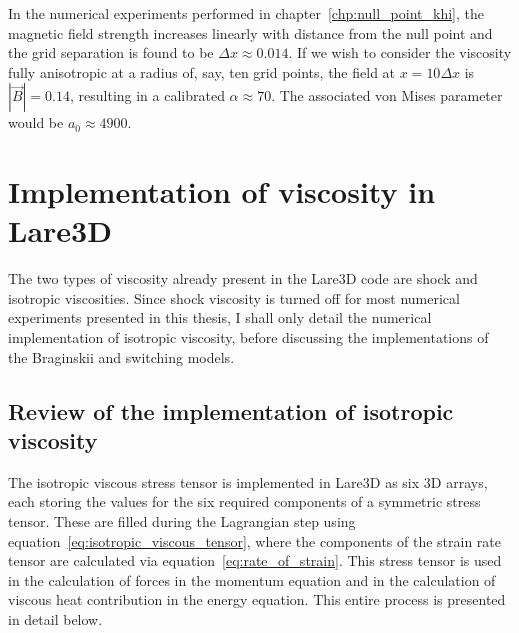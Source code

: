In the numerical experiments performed in chapter~\ref{chp:null_point_khi}, the magnetic field strength increases linearly with distance from the null point and the grid separation is found to be $\Delta x \approx 0.014$. If we wish to consider the viscosity fully anisotropic at a radius of, say, ten grid points, the field at $x = 10 \Delta x$ is $|\vec{B}| = 0.14$, resulting in a calibrated $\alpha \approx 70$. The associated von Mises parameter would be $a_0 \approx 4900$. 

\section{Implementation of viscosity in Lare3D}

The two types of viscosity already present in the Lare3D code are shock and isotropic viscosities. Since shock viscosity is turned off for most numerical experiments presented in this thesis, I shall only detail the numerical implementation of isotropic viscosity, before discussing the implementations of the Braginskii and switching models.

\subsection{Review of the implementation of isotropic viscosity}

The isotropic viscous stress tensor is implemented in Lare3D as six 3D arrays, each storing the values for the six required components of a symmetric stress tensor. These are filled during the Lagrangian step using equation~\eqref{eq:isotropic_viscous_tensor}, where the components of the strain rate tensor are calculated via equation~\eqref{eq:rate_of_strain}. This stress tensor is used in the calculation of forces in the momentum equation and in the calculation of viscous heat contribution in the energy equation. This entire process is presented in detail below.

